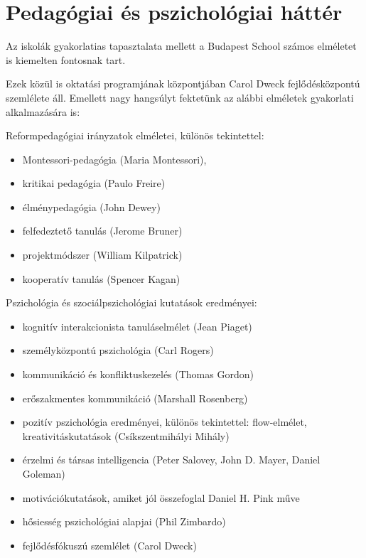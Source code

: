 \section{Pedagógiai és pszichológiai háttér}

Az iskolák gyakorlatias tapasztalata mellett a Budapest School számos elméletet is kiemelten fontosnak tart. 

Ezek közül is oktatási programjának központjában Carol Dweck fejlődésközpontú szemlélete \citep{growthmindset} áll. Emellett nagy hangsúlyt fektetünk az alábbi elméletek gyakorlati alkalmazására is:

Reformpedagógiai irányzatok elméletei, különös tekintettel:

\begin{itemize}

      \item
            Montessori-pedagógia (Maria Montessori),
      \item
            kritikai pedagógia (Paulo Freire)
      \item
            élménypedagógia (John Dewey)
      \item
            felfedeztető tanulás (Jerome Bruner)
      \item
            projektmódszer (William Kilpatrick)
      \item
            kooperatív tanulás (Spencer Kagan)
\end{itemize}

Pszichológia és szociálpszichológiai kutatások eredményei:

\begin{itemize}

      \item
            kognitív interakcionista tanuláselmélet (Jean Piaget)
      \item
            személyközpontú pszichológia (Carl Rogers)
      \item
            kommunikáció és konfliktuskezelés (Thomas Gordon)
      \item
            erőszakmentes kommunikáció (Marshall Rosenberg)
      \item
            pozitív pszichológia eredményei, különös tekintettel: flow-elmélet, kreativitáskutatások (Csík\-szent\-mihályi Mihály)
      \item
            érzelmi és társas intelligencia (Peter Salovey, John D. Mayer, Daniel Goleman)
      \item motivációkutatások, amiket jól összefoglal Daniel H. Pink műve \citep{pink2011drive}
      \item
            hősiesség pszichológiai alapjai (Phil Zimbardo)
      \item
            fejlődésfókuszú szemlélet (Carol Dweck)
\end{itemize}